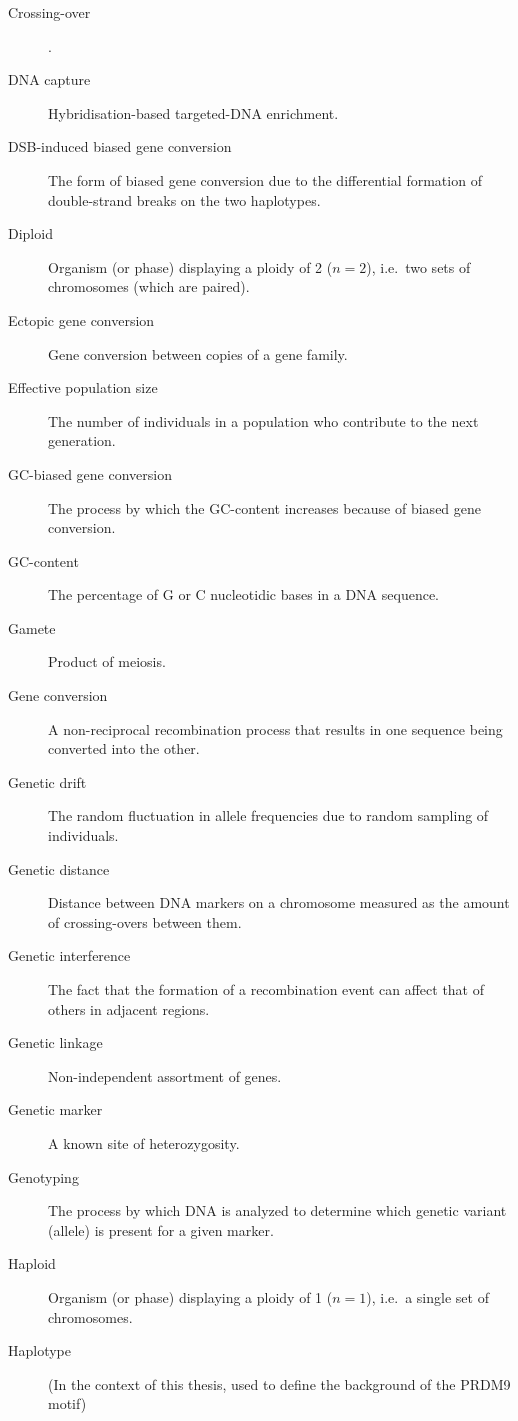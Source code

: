 \begin{alwayssingle}
\begin{description}
		\item[Crossing-over] .
		\item[DNA capture] Hybridisation-based targeted-DNA enrichment.
		\item[DSB-induced biased gene conversion] The form of biased gene conversion due to the differential formation of double-strand breaks on the two haplotypes.
		\item[Diploid] Organism (or phase) displaying a ploidy of 2 ($n=2$), i.e.\ two sets of chromosomes (which are paired).
		\item[Ectopic gene conversion] Gene conversion between copies of a gene family.
		\item[Effective population size] The number of individuals in a population who contribute to the next generation.
		\item[GC-biased gene conversion] The process by which the GC-content increases because of biased gene conversion.
		\item[GC-content] The percentage of G or C nucleotidic bases in a DNA sequence.
		\item[Gamete] Product of meiosis.
		\item[Gene conversion] A non-reciprocal recombination process that results in one sequence being converted into the other.
		\item[Genetic drift] The random fluctuation in allele frequencies due to random sampling of individuals.
		\item[Genetic distance] Distance between DNA markers on a chromosome measured as the amount of crossing-overs between them.
		\item[Genetic interference] The fact that the formation of a recombination event can affect that of others in adjacent regions.
		\item[Genetic linkage] Non-independent assortment of genes.
		\item[Genetic marker] A known site of heterozygosity.
		\item[Genotyping] The process by which DNA is analyzed to determine which genetic variant (allele) is present for a given marker.
		\item[Haploid] Organism (or phase) displaying a ploidy of 1 ($n=1$), i.e.\ a single set of chromosomes.
		\item[Haplotype] (In the context of this thesis, used to define the background of the PRDM9 motif)

\end{description}
\end{alwayssingle}
